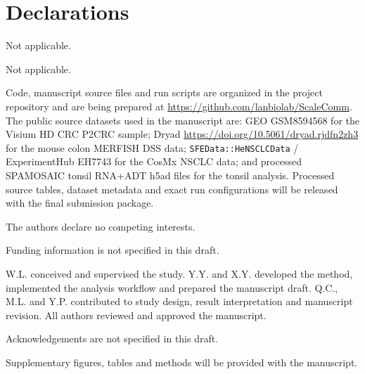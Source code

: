 \documentclass[referee,lineno,pdflatex,sn-vancouver-num]{sn-jnl}
\begin{document}
\section*{Declarations}

Not applicable.

Not applicable.

Code, manuscript source files and run scripts are organized in the project repository and are being prepared at \url{https://github.com/lanbiolab/ScaleComm}. The public source datasets used in the manuscript are: GEO GSM8594568 for the Visium HD CRC P2CRC sample; Dryad \url{https://doi.org/10.5061/dryad.rjdfn2zh3} for the mouse colon MERFISH DSS data; \texttt{SFEData::HeNSCLCData} / ExperimentHub EH7743 for the CosMx NSCLC data; and processed SPAMOSAIC tonsil RNA+ADT h5ad files for the tonsil analysis. Processed source tables, dataset metadata and exact run configurations will be released with the final submission package.

The authors declare no competing interests.

Funding information is not specified in this draft.

W.L. conceived and supervised the study. Y.Y. and X.Y. developed the method, implemented the analysis workflow and prepared the manuscript draft. Q.C., M.L. and Y.P. contributed to study design, result interpretation and manuscript revision. All authors reviewed and approved the manuscript.

Acknowledgements are not specified in this draft.

Supplementary figures, tables and methods will be provided with the manuscript.


\end{document}

